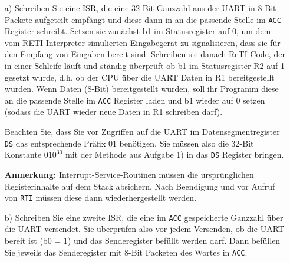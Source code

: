 \documentclass{article}
\begin{document}
\begin{itemize}
\item[a)]
Schreiben Sie eine ISR, die eine 32-Bit Ganzzahl aus der UART in 8-Bit Packete aufgeteilt empfängt und diese dann in an die passende Stelle im \texttt{ACC} Register schreibt. Setzen sie zunächst b1 im Statusregister auf 0, um dem vom RETI-Interpreter simulierten Eingabegerät zu signalisieren, dass sie für den Empfang von Eingaben bereit sind. Schreiben sie danach ReTI-Code, der in einer Schleife läuft und ständig überprüft ob b1 im Statusregister R2 auf 1 gesetzt wurde, d.h. ob der CPU über die UART Daten in R1 bereitgestellt wurden. Wenn Daten (8-Bit) bereitgestellt wurden, soll ihr Programm diese an die passende Stelle im \texttt{ACC} Register laden und b1 wieder auf 0 setzen (sodass die UART wieder neue Daten in R1 schreiben darf).

Beachten Sie, dass Sie vor Zugriffen auf die UART im Datensegmentregister \texttt{DS} das entsprechende Präfix 01 benötigen. Sie müssen also die 32-Bit Konstante $010^{30}$ mit der Methode aus Aufgabe 1) in das \texttt{DS} Register bringen.

\textbf{Anmerkung:} Interrupt-Service-Routinen müssen die ursprünglichen Registerinhalte auf dem Stack absichern. Nach Beendigung und vor Aufruf von \texttt{RTI} müssen diese dann wiederhergestellt werden.

\item[b)]
Schreiben Sie eine zweite ISR, die eine im \texttt{ACC} gespeicherte Ganzzahl über die UART versendet.
Sie überprüfen also vor jedem Versenden, ob die UART bereit ist (b0 = 1) und das Senderegister befüllt werden darf.
Dann befüllen Sie jeweils das Senderegister mit 8-Bit Packeten des Wortes in \texttt{ACC}.
\end{itemize}
\end{document}
